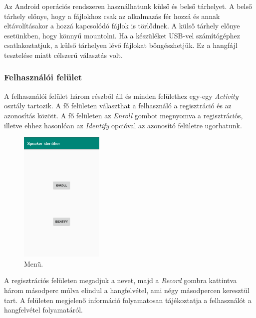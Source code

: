Az Android operációs rendszeren használhatunk külső és belső tárhelyet. A belső tárhely előnye, hogy a fájlokhoz csak az alkalmazás fér hozzá és annak eltávolításakor a hozzá kapcsolódó fájlok is törlődnek. A külső tárhely előnye esetünkben, hogy könnyű mountolni. Ha a készüléket USB-vel számítógéphez csatlakoztatjuk, a külső tárhelyen lévő fájlokat böngészhetjük. Ez a hangfájl tesztelése miatt célszerű választás volt. 



\subsubsection{Felhasználói felület}

 A felhasználói felület három részből áll és minden felülethez egy-egy \emph{Activity} osztály tartozik. A fő felületen választhat a felhasználó a regisztráció és az azonosítás között. A fő felületen az \emph{Enroll} gombot megnyomva a regisztrációs, illetve ehhez hasonlóan az \emph{Identify} opcióval az azonosító felületre ugorhatunk.


\begin{figure}[!ht]
	\centering
	\includegraphics[width=40mm, keepaspectratio]{figures/app-main-screen.png}
	\caption{Menü.}
	\label{fig:app-main-screen}
\end{figure}

A regisztrációs felületen megadjuk a nevet, majd a \emph{Record} gombra kattintva három másodperc múlva elindul a hangfelvétel, ami négy másodpercen keresztül tart. A felületen megjelenő információ folyamatosan tájékoztatja a felhasználót a hangfelvétel folyamatáról.

